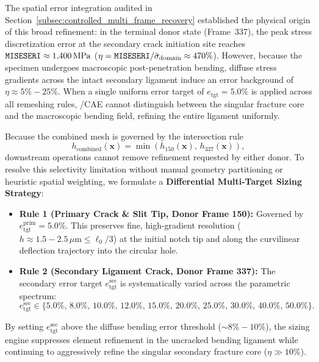The spatial error integration audited in Section~\ref{subsec:controlled_multi_frame_recovery} established the physical origin of this broad refinement: in the terminal donor state (Frame~337), the peak stress discretization error at the secondary crack initiation site reaches $\texttt{MISESERI} \approx 1{,}400\,\mathrm{MPa}$ ($\eta = \texttt{MISESERI} / \bar{\sigma}_{\mathrm{domain}} \approx 470\%$). However, because the specimen undergoes macroscopic post-penetration bending, diffuse stress gradients across the intact secondary ligament induce an error background of $\eta \approx 5\% - 25\%$. When a single uniform error target of $e_{\mathrm{tgt}} = 5.0\%$ is applied across all remeshing rules, \Abaqus/CAE cannot distinguish between the singular fracture core and the macroscopic bending field, refining the entire ligament uniformly.

Because the combined mesh is governed by the intersection rule
\begin{equation}
  h_{\mathrm{combined}}(\mathbf{x}) = \min\left(h_{150}(\mathbf{x}),\, h_{337}(\mathbf{x})\right),
  \label{eq:combined_min_sizing_repeat}
\end{equation}
downstream operations cannot remove refinement requested by either donor. To resolve this selectivity limitation without manual geometry partitioning or heuristic spatial weighting, we formulate a \textbf{Differential Multi-Target Sizing Strategy}:
\begin{itemize}
  \item \textbf{Rule 1 (Primary Crack \& Slit Tip, Donor Frame 150):} Governed by $e_{\mathrm{tgt}}^{\mathrm{prim}} = 5.0\%$. This preserves fine, high-gradient resolution ($h \approx 1.5 - 2.5\,\mu\mathrm{m} \le \ell_0/3$) at the initial notch tip and along the curvilinear deflection trajectory into the circular hole.
  \item \textbf{Rule 2 (Secondary Ligament Crack, Donor Frame 337):} The secondary error target $e_{\mathrm{tgt}}^{\mathrm{sec}}$ is systematically varied across the parametric spectrum:
  \begin{equation}
    e_{\mathrm{tgt}}^{\mathrm{sec}} \in \{5.0\%,\, 8.0\%,\, 10.0\%,\, 12.0\%,\, 15.0\%,\, 20.0\%,\, 25.0\%,\, 30.0\%,\, 40.0\%,\, 50.0\%\}.
  \end{equation}
\end{itemize}
By setting $e_{\mathrm{tgt}}^{\mathrm{sec}}$ above the diffuse bending error threshold ($\sim 8\% - 10\%$), the sizing engine suppresses element refinement in the uncracked bending ligament while continuing to aggressively refine the singular secondary fracture core ($\eta \gg 10\%$).

